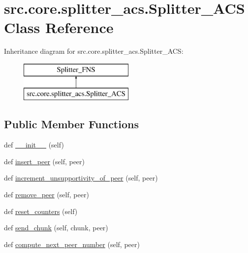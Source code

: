 \hypertarget{classsrc_1_1core_1_1splitter__acs_1_1Splitter__ACS}{}\section{src.\+core.\+splitter\+\_\+acs.\+Splitter\+\_\+\+A\+C\+S Class Reference}
\label{classsrc_1_1core_1_1splitter__acs_1_1Splitter__ACS}
Inheritance diagram for src.\+core.\+splitter\+\_\+acs.\+Splitter\+\_\+\+A\+C\+S\+:\begin{figure}[H]
\begin{center}
\leavevmode
\includegraphics[height=2.000000cm]{classsrc_1_1core_1_1splitter__acs_1_1Splitter__ACS}
\end{center}
\end{figure}
\subsection*{Public Member Functions}
\begin{DoxyCompactItemize}
\item 
def \hyperlink{classsrc_1_1core_1_1splitter__acs_1_1Splitter__ACS_ac23b604c4f1d63f291a142e47ea71471}{\+\_\+\+\_\+init\+\_\+\+\_\+} (self)
\item 
def \hyperlink{classsrc_1_1core_1_1splitter__acs_1_1Splitter__ACS_a0f940285451c895e56e8fdf00d0473ef}{insert\+\_\+peer} (self, peer)
\item 
def \hyperlink{classsrc_1_1core_1_1splitter__acs_1_1Splitter__ACS_ad98bef3ff83336097388e65abed39d07}{increment\+\_\+unsupportivity\+\_\+of\+\_\+peer} (self, peer)
\item 
def \hyperlink{classsrc_1_1core_1_1splitter__acs_1_1Splitter__ACS_a3c5df7e863da1ed06bdd5cf0281ced87}{remove\+\_\+peer} (self, peer)
\item 
def \hyperlink{classsrc_1_1core_1_1splitter__acs_1_1Splitter__ACS_a9d6818ebb334e4cb90b427f9d2e825e6}{reset\+\_\+counters} (self)
\item 
def \hyperlink{classsrc_1_1core_1_1splitter__acs_1_1Splitter__ACS_a810084dae6063307d4c9585958899c9b}{send\+\_\+chunk} (self, chunk, peer)
\item 
def \hyperlink{classsrc_1_1core_1_1splitter__acs_1_1Splitter__ACS_aa16e0352e28e26f4969ffc91b8e4ac80}{compute\+\_\+next\+\_\+peer\+\_\+number} (self, peer)
\end{DoxyCompactItemize}
